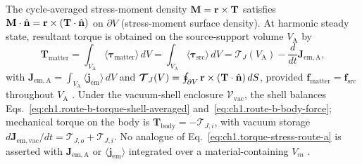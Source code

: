 The cycle-averaged stress-moment density $\mathbf{M}=\mathbf{r}\times\mathbf{T}$ satisfies
$\mathbf{M}\cdot\hat{\mathbf{n}}=\mathbf{r}\times(\mathbf{T}\cdot\hat{\mathbf{n}})$ on $\partial V$ (stress-moment surface density).
At harmonic steady state, resultant torque is obtained on the source-support volume $V_{\mathrm{A}}$ by
\begin{equation}
\label{eq:ch1.torque-stress-route-a}
\mathbf{T}_{\mathrm{matter}}
=\int_{V_{\mathrm{A}}}\langle\boldsymbol{\tau}_{\mathrm{matter}}\rangle\,dV
=\int_{V_{\mathrm{A}}}\langle\boldsymbol{\tau}_{\mathrm{src}}\rangle\,dV
=\boldsymbol{\mathcal{T}}_J(V_{\mathrm{A}})
-\frac{d}{dt}\mathbf{J}_{\mathrm{em,A}},
\end{equation}
with $\mathbf{J}_{\mathrm{em,A}}=\int_{V_{\mathrm{A}}}\langle\mathbf{j}_{\mathrm{em}}\rangle\,dV$ and $\boldsymbol{\mathcal{T}}_J(V)=\oint_{\partial V}\mathbf{r}\times(\mathbf{T}\cdot\hat{\mathbf{n}})\,dS$, provided $\mathbf{f}_{\mathrm{matter}}=\mathbf{f}_{\mathrm{src}}$ throughout $V_{\mathrm{A}}$ \cite{beth1936,stratton1941}. Under the vacuum-shell enclosure $\mathcal{V}_{\mathrm{vac}}$, the shell balances Eqs.~\eqref{eq:ch1.route-b-torque-shell-averaged} and~\eqref{eq:ch1.route-b-body-force}; mechanical torque on the body is $\mathbf{T}_{\mathrm{body}}=-\boldsymbol{\mathcal{T}}_{J,i}$, with vacuum storage $d\mathbf{J}_{\mathrm{em,vac}}/dt=\boldsymbol{\mathcal{T}}_{J,o}+\boldsymbol{\mathcal{T}}_{J,i}$. No analogue of Eq.~\eqref{eq:ch1.torque-stress-route-a} is asserted with $\mathbf{J}_{\mathrm{em,A}}$ or $\langle\mathbf{j}_{\mathrm{em}}\rangle$ integrated over a material-containing $V_m$ \cite{harrington2001}.

